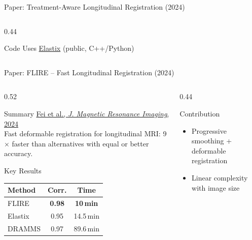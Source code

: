 \documentclass[aspectratio=169,xcolor=dvipsnames]{beamer}
\begin{document}
\begin{frame}{Paper: Treatment-Aware Longitudinal Registration (2024)}
\begin{columns}
\begin{column}{0.44\textwidth}
            \begin{exampleblock}{\scriptsize {} Code}
                \scriptsize Uses \href{https://elastix.lumc.nl/}{Elastix} (public, C++/Python)
            \end{exampleblock}
        \end{column}
    \end{columns}
\end{frame}

\begin{frame}{Paper: FLIRE -- Fast Longitudinal Registration (2024)}
    \begin{columns}
        \begin{column}{0.52\textwidth}
            \begin{block}{Summary}
                \small
                \href{https://doi.org/10.1002/jmri.29474}{Fei et al., \textit{J. Magnetic Resonance Imaging}, 2024}\\[0.3em]
                Fast deformable registration for longitudinal MRI: 9$\times$ faster than alternatives with equal or better accuracy.
            \end{block}

            \vspace{0.2em}

            \begin{block}{Key Results}
                \small
                \begin{tabular}{lcc}
                    \toprule
                    \textbf{Method} & \textbf{Corr.} & \textbf{Time} \\
                    \midrule
                    FLIRE & \textbf{0.98} & \textbf{10\,min} \\
                    Elastix & 0.95 & 14.5\,min \\
                    DRAMMS & 0.97 & 89.6\,min \\
                    \bottomrule
                \end{tabular}
            \end{block}
        \end{column}

        \begin{column}{0.44\textwidth}
            \begin{block}{Contribution}
                \small
                \begin{itemize}
                    \item Progressive smoothing + deformable registration
                    \item Linear complexity with image size
                \end{itemize}
            \end{block}


\end{column}
\end{columns}
\end{frame}
\end{document}
